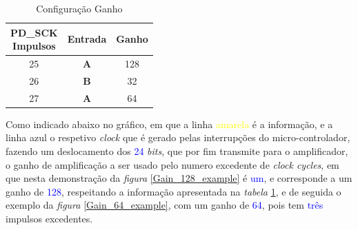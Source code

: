 \begin{minipage}[!b]{\linewidth}
\begin{minipage}[!b]{.40\linewidth}
	\begin{table}[H]
		\captionsetup{justification=raggedright,singlelinecheck=false}
		\caption{Configuração Ganho}
		\begin{tabular}{ | c | c | c |  }
			\hline
			\makecell[c]{PD\_SCK \\ Impulsos} & Entrada  & Ganho \\
			\hline
			\hline
			25 & \textbf{A} & 128 \\
			\hline
			26 & \textbf{B} & 32 \\
			\hline
			27 & \textbf{A} & 64 \\
			\hline
		\end{tabular}
		\label{Gain_Selection}
	\end{table}
\end{minipage}
\begin{minipage}[l]{.6\linewidth}
\vspace{.3cm}
Como indicado abaixo no gráfico, em que a linha \textcolor{yellow}{amarela} é a informação, e a linha \textcolor{BlueGreen}{azul} o respetivo \textit{clock} que é gerado pelas interrupções do micro-controlador, fazendo um deslocamento dos \textcolor{blue}{24} \textit{bits}, que por fim transmite para o amplificador, o ganho de amplificação a ser usado pelo numero excedente de \textit{clock cycles}, em que nesta demonstração da \textit{figura} \ref{Gain_128_example} é \textcolor{blue}{um}, e corresponde a um ganho de \textcolor{blue}{128}, respeitando a informação apresentada na \textit{tabela} \ref{Gain_Selection},  e de seguida o exemplo da \textit{figura} \ref{Gain_64_example}, com um ganho de \textcolor{blue}{64}, pois tem \textcolor{blue}{três} impulsos excedentes.
\end{minipage}
\end{minipage}
\\
